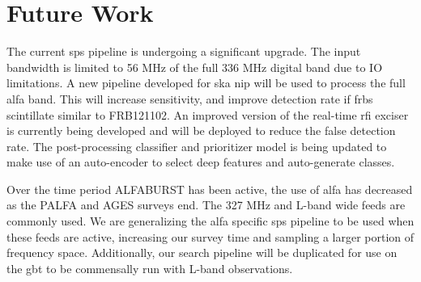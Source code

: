 \documentclass[a4paper,fleqn,usenatbib]{mnras}
\begin{document}
\section{Future Work}
\label{sec:future_work}

The current \gls*{sps} pipeline is undergoing a significant upgrade. The input
bandwidth is limited to 56 MHz of the full 336 MHz digital band due to IO
limitations. A new pipeline developed for \gls*{ska} \gls*{nip} will be used to
process the full \gls*{alfa} band. This will increase sensitivity, and improve
detection rate if \glspl*{frb} scintillate similar to FRB121102. An improved
version of the real-time \gls*{rfi} exciser is currently being developed and
will be deployed to reduce the false detection rate. The post-processing
classifier and prioritizer model is being updated to make use of an auto-encoder
to select deep features and auto-generate classes.

Over the time period ALFABURST has been active, the use of \gls*{alfa} has
decreased as the PALFA and AGES surveys end. The 327 MHz and L-band wide feeds
are commonly used. We are generalizing the \gls*{alfa} specific \gls*{sps}
pipeline to be used when these feeds are active, increasing our survey time and
sampling a larger portion of frequency space. Additionally, our search pipeline
will be duplicated for use on the \gls*{gbt} to be commensally run with L-band
observations. 


 

\bsp	%
\label{lastpage}
\end{document}
